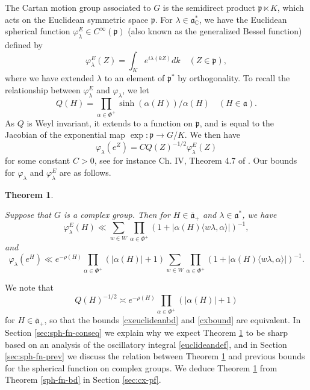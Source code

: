 \documentclass[12pt]{amsart}
\newtheorem{theorem}{Theorem}[section]
\theoremstyle{remark}
\newcommand{\C}{\mathbb C}
\newcommand{\p}{\mathfrak p}
\newcommand{\ga}{\mathfrak a}
\newcommand{\be}{\begin{equation}}
\newcommand{\ee}{\end{equation}}
\begin{document}
The Cartan motion group associated to $G$ is the semidirect product $\p \ltimes K$, which acts on the Euclidean symmetric space $\p$.  For $\lambda \in \ga^*_\C$, we have the Euclidean spherical function $\varphi_\lambda^E \in C^\infty(\p)$ (also known as the generalized Bessel function) defined by
\be
\label{euclideandef}
\varphi_\lambda^E(Z) = \int_K e^{ i\lambda( kZ) } dk \quad (Z \in \p),
\ee
where we have extended $\lambda$ to an element of $\p^*$ by orthogonality.  To recall the relationship between $\varphi_\lambda^E$ and $\varphi_\lambda$, we let
\[
Q(H) = \prod_{\alpha \in \Phi^+} \sinh(\alpha(H))/\alpha(H)\quad (H\in\ga).
\]
As $Q$ is Weyl invariant, it extends to a function on $\p$, and is equal to the Jacobian of the exponential map $\exp: \p \to G/K$.  We then have 
\[
\varphi_\lambda(e^Z) = C Q(Z)^{-1/2} \varphi_\lambda^E(Z)
\]
for some constant $C > 0$, see for instance Ch. IV, Theorem 4.7 of \cite{Helgason_00}.  Our bounds for $\varphi_\lambda$ and $\varphi_\lambda^E$ are as follows.

\begin{theorem}
\label{sph-fn-cx}

Suppose that $G$ is a complex group.  Then for $H \in \overline{\ga}_+$ and $\lambda \in \ga^*$, we have
\be
\label{cxeuclideanbd}
\varphi_\lambda^E(H) \ll \sum_{w \in W} \prod_{\alpha \in \Phi^+} (1 + |\alpha(H) \langle w\lambda, \alpha \rangle|)^{-1},
\ee
and
\be
\label{cxbound}
\varphi_\lambda(e^H) \ll e^{-\rho(H)} \prod_{\alpha \in \Phi^+} (|\alpha(H)|+1) \sum_{w \in W} \prod_{\alpha \in \Phi^+} (1 + |\alpha(H) \langle w\lambda, \alpha \rangle|)^{-1}.
\ee

\end{theorem}

We note that
\[
Q(H)^{-1/2} \asymp e^{-\rho(H)} \prod_{\alpha \in \Phi^+} (|\alpha(H)|+1)
\]
for $H \in \overline{\ga}_+$, so that the bounds \eqref{cxeuclideanbd} and \eqref{cxbound} are equivalent.  In Section \ref{sec:sph-fn-conseq} we explain why we expect Theorem \ref{sph-fn-cx} to be sharp based on an analysis of the oscillatory integral \eqref{euclideandef}, and in Section \ref{sec:sph-fn-prev} we discuss the relation between Theorem \ref{sph-fn-cx} and previous bounds for the spherical function on complex groups.  We deduce Theorem \ref{sph-fn-cx} from Theorem \ref{sph-fn-bd} in Section \ref{sec:cx-pf}.
\end{document}
